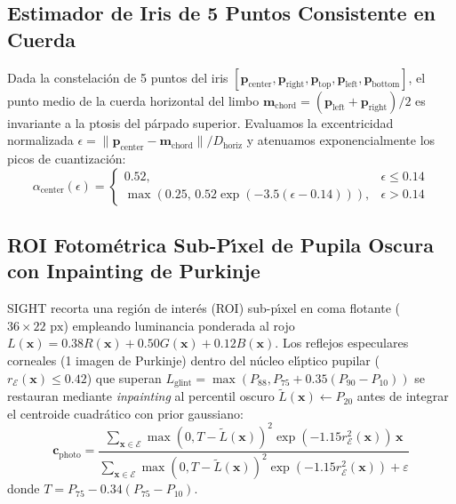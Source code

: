 \documentclass[twocolumn,10pt]{article}
\begin{document}
\subsection{Estimador de Iris de 5 Puntos Consistente en Cuerda}
Dada la constelaci\'on de 5 puntos del iris $[\mathbf{p}_{\text{center}}, \mathbf{p}_{\text{right}}, \mathbf{p}_{\text{top}}, \mathbf{p}_{\text{left}}, \mathbf{p}_{\text{bottom}}]$, el punto medio de la cuerda horizontal del limbo $\mathbf{m}_{\text{chord}} = (\mathbf{p}_{\text{left}} + \mathbf{p}_{\text{right}})/2$ es invariante a la ptosis del p\'arpado superior. Evaluamos la excentricidad normalizada $\epsilon = \|\mathbf{p}_{\text{center}} - \mathbf{m}_{\text{chord}}\| / D_{\text{horiz}}$ y atenuamos exponencialmente los picos de cuantizaci\'on:
\begin{equation}
\alpha_{\text{center}}(\epsilon) = \begin{cases} 0.52, & \epsilon \le 0.14 \\ \max\!\left(0.25,\, 0.52 \exp(-3.5(\epsilon - 0.14))\right), & \epsilon > 0.14 \end{cases}
\end{equation}

\subsection{ROI Fotom\'etrica Sub-P\'{\i}xel de Pupila Oscura con Inpainting de Purkinje}
SIGHT recorta una regi\'on de inter\'es (ROI) sub-p\'{\i}xel en coma flotante ($36 \times 22\text{ px}$) empleando luminancia ponderada al rojo $L(\mathbf{x}) = 0.38 R(\mathbf{x}) + 0.50 G(\mathbf{x}) + 0.12 B(\mathbf{x})$. Los reflejos especulares corneales (1\textordfeminine{} imagen de Purkinje) dentro del n\'ucleo el\'{\i}ptico pupilar ($r_{\mathcal{E}}(\mathbf{x}) \le 0.42$) que superan $L_{\text{glint}} = \max(P_{88}, P_{75} + 0.35(P_{90} - P_{10}))$ se restauran mediante \textit{inpainting} al percentil oscuro $\tilde{L}(\mathbf{x}) \leftarrow P_{20}$ antes de integrar el centroide cuadr\'atico con prior gaussiano:
\begin{equation}
\mathbf{c}_{\text{photo}} = \frac{\sum_{\mathbf{x} \in \mathcal{E}} \max(0, T - \tilde{L}(\mathbf{x}))^2 \exp(-1.15 r_{\mathcal{E}}^2(\mathbf{x}))\,\mathbf{x}}{\sum_{\mathbf{x} \in \mathcal{E}} \max(0, T - \tilde{L}(\mathbf{x}))^2 \exp(-1.15 r_{\mathcal{E}}^2(\mathbf{x})) + \varepsilon}
\end{equation}
donde $T = P_{75} - 0.34(P_{75} - P_{10})$.
\end{document}
